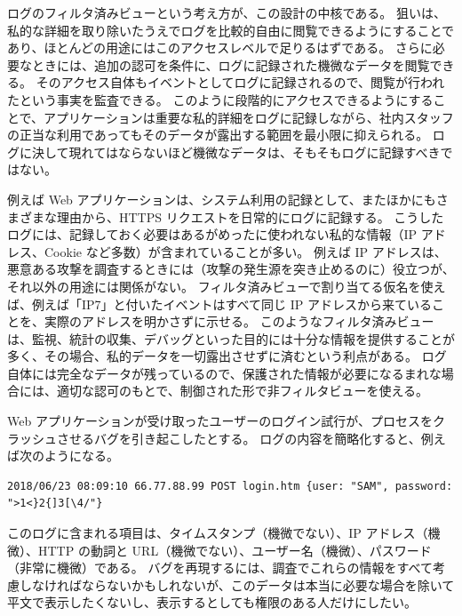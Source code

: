 \documentclass[uplatex]{jsarticle}
\def\label#1{}%
\begin{document}
ログのフィルタ済みビューという考え方が、この設計の中核である。
狙いは、私的な詳細を取り除いたうえでログを比較的自由に閲覧できるようにすることであり、ほとんどの用途にはこのアクセスレベルで足りるはずである。
さらに必要なときには、追加の認可を条件に、ログに記録された機微なデータを閲覧できる。
そのアクセス自体もイベントとしてログに記録されるので、閲覧が行われたという事実を監査できる。
このように段階的にアクセスできるようにすることで、アプリケーションは重要な私的詳細をログに記録しながら、社内スタッフの正当な利用であってもそのデータが露出する範囲を最小限に抑えられる。
ログに決して現れてはならないほど機微なデータは、そもそもログに記録すべきではない。

例えば Web アプリケーションは、システム利用の記録として、またほかにもさまざまな理由から、HTTPS リクエストを日常的にログに記録する。
こうしたログには、記録しておく必要はあるがめったに使われない私的な情報（IP アドレス、Cookie など多数）が含まれていることが多い。
例えば IP アドレスは、悪意ある攻撃を調査するときには（攻撃の発生源を突き止めるのに）役立つが、それ以外の用途には関係がない。
フィルタ済みビューで割り当てる仮名を使えば、例えば「IP7」と付いたイベントはすべて同じ IP アドレスから来ていることを、実際のアドレスを明かさずに示せる。
このようなフィルタ済みビューは、監視、統計の収集、デバッグといった目的には十分な情報を提供することが多く、その場合、私的データを一切露出させずに済むという利点がある。
ログ自体には完全なデータが残っているので、保護された情報が必要になるまれな場合には、適切な認可のもとで、制御された形で非フィルタビューを使える。

\begin{exa}[ログイン試行のログ]\label{exa:appa-login-log}
Web アプリケーションが受け取ったユーザーのログイン試行が、プロセスをクラッシュさせるバグを引き起こしたとする。
ログの内容を簡略化すると、例えば次のようになる。
{\footnotesize
\begin{verbatim}
2018/06/23 08:09:10 66.77.88.99 POST login.htm {user: "SAM", password: ">1<}2{]3[\4/"}
\end{verbatim}
}
このログに含まれる項目は、タイムスタンプ（機微でない）、IP アドレス（機微）、HTTP の動詞と URL（機微でない）、ユーザー名（機微）、パスワード（非常に機微）である。
バグを再現するには、調査でこれらの情報をすべて考慮しなければならないかもしれないが、このデータは本当に必要な場合を除いて平文で表示したくないし、表示するとしても権限のある人だけにしたい。
\end{exa}
\end{document}
